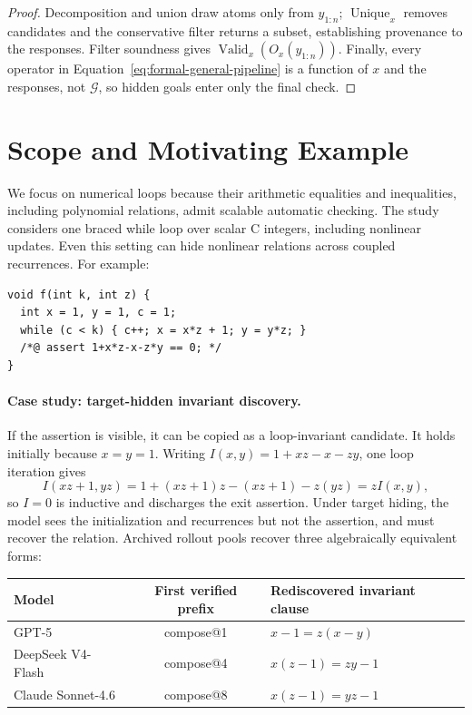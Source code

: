 \begin{proof}
Decomposition and union draw atoms only from \(y_{1:n}\);
\(\operatorname{Unique}_x\) removes candidates and the conservative filter
returns a subset, establishing provenance to the responses.  Filter soundness
gives \(\operatorname{Valid}_x(O_x(y_{1:n}))\).  Finally, every operator in
Equation~\eqref{eq:formal-general-pipeline} is a function of \(x\) and the
responses, not \(\mathcal G\), so hidden goals enter only the final check.
\end{proof}

\section{Scope and Motivating Example}
\label{app:scope-example}

We focus on numerical loops because their arithmetic equalities and
inequalities, including polynomial relations, admit scalable automatic
checking.  The study considers one braced while loop over scalar C integers,
including nonlinear updates.  Even this setting can hide nonlinear relations
across coupled recurrences.  For example:
\begin{lstlisting}
void f(int k, int z) {
  int x = 1, y = 1, c = 1;
  while (c < k) { c++; x = x*z + 1; y = y*z; }
  /*@ assert 1+x*z-x-z*y == 0; */
}
\end{lstlisting}

\paragraph{Case study: target-hidden invariant discovery.}
If the assertion is visible, it can be copied as a loop-invariant candidate.
It holds initially because \(x=y=1\).  Writing
\(I(x,y)=1+xz-x-zy\), one loop iteration gives
\[
  I(xz+1,yz)
  =1+(xz+1)z-(xz+1)-z(yz)
  =zI(x,y),
\]
so \(I=0\) is inductive and discharges the exit assertion.  Under target
hiding, the model sees the initialization and recurrences but not the
assertion, and must recover the relation.  Archived rollout pools recover
three algebraically equivalent forms:

\begin{center}
\small
\setlength{\tabcolsep}{4pt}
\begin{tabular}{lcl}
\toprule
\rowcolor{algobg}
Model & First verified prefix & Rediscovered invariant clause \\
\midrule
GPT-5 & compose@1 & \(x-1=z(x-y)\) \\
DeepSeek V4-Flash & compose@4 & \(x(z-1)=zy-1\) \\
Claude Sonnet-4.6 & compose@8 & \(x(z-1)=yz-1\) \\
\bottomrule
\end{tabular}
\end{center}

